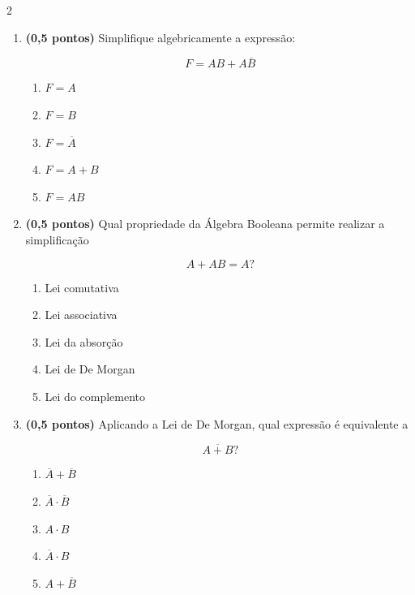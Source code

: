 \documentclass[a4paper,12pt]{article}
\begin{document}
\begin{multicols}{2}
\begin{enumerate}[leftmargin=*]
\item \textbf{(0,5 pontos)} Simplifique algebricamente a expressão:

\[
F=AB+A\overline{B}
\]

\begin{enumerate}[label=(\Alph*)]
    \item $F=A$
    \item $F=B$
    \item $F=\overline{A}$
    \item $F=A+B$
    \item $F=AB$
\end{enumerate}

\vspace{0.2cm}


\item \textbf{(0,5 pontos)} Qual propriedade da Álgebra Booleana permite
realizar a simplificação

\[
A+A B=A?
\]

\begin{enumerate}[label=(\Alph*)]
    \item Lei comutativa
    \item Lei associativa
    \item Lei da absorção
    \item Lei de De Morgan
    \item Lei do complemento
\end{enumerate}

\vspace{0.2cm}


\item \textbf{(0,5 pontos)} Aplicando a Lei de De Morgan, qual expressão é
equivalente a

\[
\overline{A+B}?
\]

\begin{enumerate}[label=(\Alph*)]
    \item $\overline{A}+\overline{B}$
    \item $\overline{A}\cdot\overline{B}$
    \item $A\cdot B$
    \item $\overline{A}\cdot B$
    \item $A+\overline{B}$
\end{enumerate}


\end{enumerate}
\end{multicols}
\end{document}
